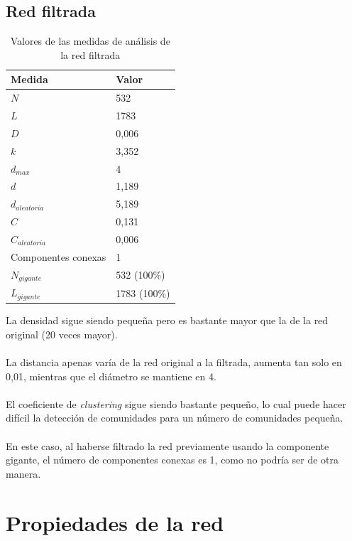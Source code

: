 \subsection{Red filtrada}

\begin{table}[H]
	\centering
	\caption{Valores de las medidas de análisis de la red filtrada}
	\label{tab:medidas-filtrada}
	\begin{tabular}{| l | l |}
		\hline
		Medida                & Valor        \\ 
		\hline
		$N$                   & 532          \\
		$L$                   & 1783         \\
		$D$                   & 0,006        \\
		$k$                   & 3,352        \\
		$d_{max}$             & 4            \\
		$d$                   & 1,189        \\
		$d_{aleatoria}$       & 5,189        \\
		$C$                   & 0,131        \\
		$C_{aleatoria}$       & 0,006        \\ 
		Componentes conexas   & 1            \\ 
		$N_{gigante}$         & 532 (100\%)  \\ 
		$L_{gigante}$         & 1783 (100\%) \\ 
		\hline
	\end{tabular}
\end{table}

La densidad sigue siendo pequeña pero es bastante mayor que la de la red original (20 veces mayor).
\\ \\
La distancia apenas varía de la red original a la filtrada, aumenta tan solo en 0,01, mientras que el diámetro se mantiene en 4.
\\ \\
El coeficiente de \textit{clustering} sigue siendo bastante pequeño, lo cual puede hacer difícil la detección de comunidades para un número de comunidades pequeña.
\\ \\
En este caso, al haberse filtrado la red previamente usando la componente gigante, el número de componentes conexas es 1, como no podría ser de otra manera.

\section{Propiedades de la red}

